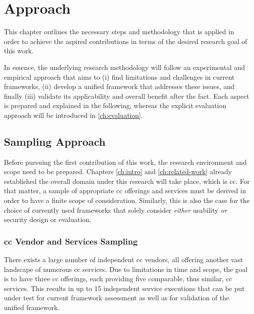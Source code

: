 	\chapter{Approach}
	\label{ch:approach}

This chapter outlines the necessary steps and methodology that is applied in order to achieve the aspired contributions in terms of the desired research goal of this work.

In essence, the underlying research methodology will follow an experimental and empirical approach that aims to (i) find limitations and challenges in current frameworks, (ii) develop a unified framework that addresses these issues, and finally (iii) validate its applicability and overall benefit after the fact. Each aspect is prepared and explained in the following, whereas the explicit evaluation approach will be introduced in \autoref{ch:evaluation}.


\section{Sampling Approach}

Before pursuing the first contribution of this work, the research environment and scope need to be prepared. Chapters \ref{ch:intro} and \ref{ch:related-work} already established the overall domain under this research will take place, which is \acl{cc}. For that matter, a sample of appropriate \ac{cc} offerings and services must be derived in order to have a finite scope of consideration. Similarly, this is also the case for the choice of currently used frameworks that solely consider \textit{either} usability \textit{or} security design or evaluation. 

\subsection{\acs{cc} Vendor and Services Sampling}

There exists a large number of independent \ac{cc} vendors, all offering another vast landscape of numerous \ac{cc} services. Due to limitations in time and scope, the goal is to have three \ac{cc} offerings, each providing five comparable, thus similar, \ac{cc} services. This results in up to 15 independent service executions that can be put under test for current framework assessment as well as for validation of the unified framework.

